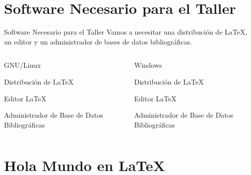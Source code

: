 \documentclass[11pt]{beamer}
\begin{document}
\section{Software Necesario para el Taller}
\begin{frame}[fragile]{Software Necesario para el Taller}
Vamos a necesitar una distribución de \LaTeX{}, un editor y un administrador de bases de datos bibliográficas.

\vspace{1em}

\begin{columns}
\begin{block}{\small GNU/Linux}
\begin{footnotesize}
\begin{description}[fontsize=\small]
  \item[Texlive:] Distribución de \LaTeX{}
  \item[TexMaker:] Editor \LaTeX{}
  \item[JabRef:] Administrador de Base de Datos Bibliográficas
\end{description}
\end{footnotesize}
\end{block}

\begin{block}{\small Windows}
\begin{footnotesize}
\begin{description}[fontsize=\small]
  \item[MikTex:] Distribución de \LaTeX{}
  \item[TexMaker:] Editor \LaTeX{}
  \item[JabRef:] Administrador de Base de Datos Bibliográficas
\end{description}
\end{footnotesize}
\end{block}
\end{columns}

\end{frame}

\section{Hola Mundo en \LaTeX}
\end{document}

